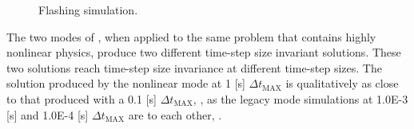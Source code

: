 \begin{figure}[h!t]
\centering
{}
\caption{Flashing simulation.}
\label{fig:flashing_solutions_1}
\end{figure}

The two modes of \cobra{}, when applied to the same problem that contains highly nonlinear physics, produce two different time-step size invariant solutions.
These two solutions reach time-step size invariance at different time-step sizes.
The solution produced by the nonlinear mode at 1 [s] $\Delta t_{\text{MAX}}$ is qualitatively as close to that produced with a 0.1 [s] $\Delta t_{\text{MAX}}$, , as the legacy mode simulations at 1.0E-3 [s] and 1.0E-4 [s] $\Delta t_{\text{MAX}}$ are to each other, .

